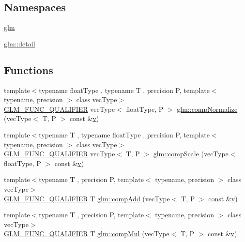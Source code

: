 \subsection*{Namespaces}
\begin{DoxyCompactItemize}
\item 
 \mbox{\hyperlink{namespaceglm}{glm}}
\item 
 \mbox{\hyperlink{namespaceglm_1_1detail}{glm\+::detail}}
\end{DoxyCompactItemize}
\subsection*{Functions}
\begin{DoxyCompactItemize}
\item 
{\footnotesize template$<$typename float\+Type , typename T , precision P, template$<$ typename, precision $>$ class vec\+Type$>$ }\\\mbox{\hyperlink{setup_8hpp_a33fdea6f91c5f834105f7415e2a64407}{G\+L\+M\+\_\+\+F\+U\+N\+C\+\_\+\+Q\+U\+A\+L\+I\+F\+I\+ER}} vec\+Type$<$ float\+Type, P $>$ \mbox{\hyperlink{group__gtx__component__wise_gaeb34fdf090d2d4da9babcdfec267f09e}{glm\+::comp\+Normalize}} (vec\+Type$<$ T, P $>$ const \&\mbox{\hyperlink{glad_8h_a14cfbe2fc2234f5504618905b69d1e06}{v}})
\item 
{\footnotesize template$<$typename T , typename float\+Type , precision P, template$<$ typename, precision $>$ class vec\+Type$>$ }\\\mbox{\hyperlink{setup_8hpp_a33fdea6f91c5f834105f7415e2a64407}{G\+L\+M\+\_\+\+F\+U\+N\+C\+\_\+\+Q\+U\+A\+L\+I\+F\+I\+ER}} vec\+Type$<$ T, P $>$ \mbox{\hyperlink{group__gtx__component__wise_gaea99a3271016bfd331d9fa7587f3db37}{glm\+::comp\+Scale}} (vec\+Type$<$ float\+Type, P $>$ const \&\mbox{\hyperlink{glad_8h_a14cfbe2fc2234f5504618905b69d1e06}{v}})
\item 
{\footnotesize template$<$typename T , precision P, template$<$ typename, precision $>$ class vec\+Type$>$ }\\\mbox{\hyperlink{setup_8hpp_a33fdea6f91c5f834105f7415e2a64407}{G\+L\+M\+\_\+\+F\+U\+N\+C\+\_\+\+Q\+U\+A\+L\+I\+F\+I\+ER}} T \mbox{\hyperlink{namespaceglm_a766b58e13ddfe3140ce22939887aa954}{glm\+::comp\+Add}} (vec\+Type$<$ T, P $>$ const \&\mbox{\hyperlink{glad_8h_a14cfbe2fc2234f5504618905b69d1e06}{v}})
\item 
{\footnotesize template$<$typename T , precision P, template$<$ typename, precision $>$ class vec\+Type$>$ }\\\mbox{\hyperlink{setup_8hpp_a33fdea6f91c5f834105f7415e2a64407}{G\+L\+M\+\_\+\+F\+U\+N\+C\+\_\+\+Q\+U\+A\+L\+I\+F\+I\+ER}} T \mbox{\hyperlink{namespaceglm_a2b7811672b3a9afce8913dae19548b30}{glm\+::comp\+Mul}} (vec\+Type$<$ T, P $>$ const \&\mbox{\hyperlink{glad_8h_a14cfbe2fc2234f5504618905b69d1e06}{v}})

\end{DoxyCompactItemize}
